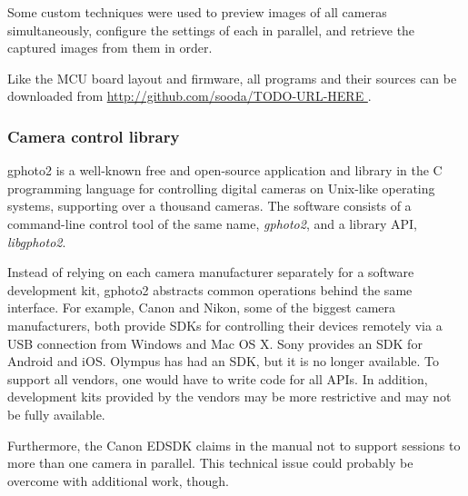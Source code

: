 

Some custom techniques were used to preview images of all cameras simultaneously, configure the settings of each in parallel, and retrieve the captured images from them in order.

Like the MCU board layout and firmware, all programs and their sources can be downloaded from \url { http://github.com/sooda/TODO-URL-HERE }.


\subsubsection{Camera control library} %

gphoto2 \cite{gphoto2} is a well-known free and open-source application and library in the C programming language for controlling digital cameras on Unix-like operating systems, supporting over a thousand cameras.
The software consists of a command-line control tool of the same name, \emph{gphoto2}, and a library API, \emph{libgphoto2}.

Instead of relying on each camera manufacturer separately for a software development kit, gphoto2 abstracts common operations behind the same interface.
For example, Canon and Nikon, some of the biggest camera manufacturers, both provide SDKs for controlling their devices remotely via a USB connection from Windows and Mac OS X. \cite{canonsdk} \cite{nikonsdk}
Sony provides an SDK for Android and iOS. \cite{sonysdk}
Olympus has had an SDK, but it is no longer available. \cite{olympussdk}
To support all vendors, one would have to write code for all APIs.
In addition, development kits provided by the vendors may be more restrictive and may not be fully available.

Furthermore, the Canon EDSDK claims in the manual not to support sessions to more than one camera in parallel.
This technical issue could probably be overcome with additional work, though.

